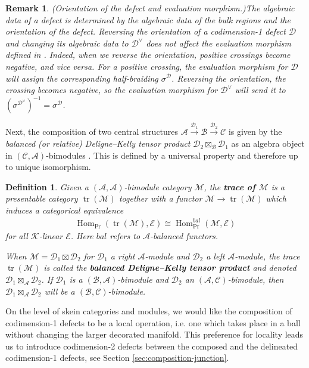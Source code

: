 \documentclass[a4paper]{article}
\numberwithin{equation}{section}
\newtheorem{definition}[counter]{Definition}
\newtheorem{remark}[counter]{Remark}
\newcommand{\1}{{\mathrm{1}\mkern-4mu{\mathchoice{}{}{\mskip-0.5mu}{\mskip-1mu}}\mathrm{l}}}
\DeclareMathOperator{\Hom}{Hom}
\newcommand{\A}{\mathcal{A}}
\newcommand{\B}{\mathcal{B}}
\newcommand{\C}{\mathcal{C}}
\newcommand{\D}{\mathcal{D}}
\newcommand{\E}{\mathcal{E}}
\newcommand{\K}{\mathcal{K}}
\newcommand{\M}{\mathcal{M}}
\DeclareMathOperator{\tr}{tr}
\begin{document}
\begin{remark}(Orientation of the defect and evaluation morphism.)\label{rmk:orientation_and_evaluation_morphism}
    The algebraic data of a defect is determined by the algebraic data of the bulk regions and the orientation of the defect. Reversing the orientation of a codimension-1 defect $\D$ and changing its algebraic data to $\D^\vee$ does not affect  the evaluation morphism defined in \cite{Brown_Jordan_2025}. Indeed, when we reverse the orientation, positive crossings become negative, and vice versa. For a positive crossing, the evaluation morphism for $\D$ will assign the corresponding half-braiding $\sigma^\D$. Reversing the orientation, the crossing becomes negative, so the evaluation morphism for $\D^\vee$ will send it to $(\sigma^{\D^\vee})^{-1}=\sigma^\D$.
\end{remark}

Next, the composition of two central structures $\A\overset{\D_1}{\longrightarrow}\B \overset{\D_2}{\longrightarrow}\C$ is given by the \emph{balanced (or relative) Deligne--Kelly tensor product} $\D_2\boxtimes_{\B}\D_1$ as an algebra object in $(\C,\A)$-bimodules \cite{Douglas_Schommer-Pries_Snyder_2019,BJS2021}. This is defined by a universal property and therefore up to unique isomorphism.
\begin{definition}\label{def:rel-DK-and-trace}
    Given a $(\A,\A)$-bimodule category $\mathcal{M}$, the \emph{\bf trace of $\mathcal{M}$} is a presentable category $\tr(\mathcal{M})$ together with a functor $\mathcal{M} \to \tr(\mathcal{M})$ which induces a categorical equivalence
\begin{align}
  \Hom_{\Pr}(\tr(\mathcal{M}), \mathcal{E}) \cong \Hom^{bal}_{\Pr}(\mathcal{M}, \mathcal{E})
\end{align}
    for all $\K$-linear $\E$. Here $bal$ refers to $\A$-balanced functors.

    When $\M=\D_1\boxtimes\D_2$ for $\D_1$ a right $\A$-module and $\D_2$ a left $\A$-module, the trace $\tr(\M)$ is called the \emph{\bf balanced Deligne--Kelly tensor product} and denoted $ \D_1\boxtimes_\A\D_2$.
    If $\D_1$ is a $(\B,\A)$-bimodule and $\D_2$ an $(\A,\C)$-bimodule, then $\D_1\boxtimes_\A \D_2$ will be a $(\B,\C)$-bimodule.
\end{definition}

On the level of skein categories and modules, we would like the composition of codimension-1 defects to be a local operation, i.e. one which takes place in a ball without changing the larger decorated manifold.
This preference for locality leads us to introduce codimension-2 defects between the composed and the delineated codimension-1 defects, see Section \ref{sec:composition-junction}.
\end{document}
